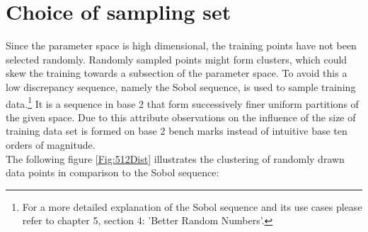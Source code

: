 	\section{Choice of sampling set}
		Since the parameter space is high dimensional, the training points have not been selected randomly. Randomly sampled points might form clusters, which could skew the training towards a subsection of the parameter space. To avoid this a low discrepancy sequence, namely the Sobol sequence, is used to sample training data.\footnote{For a more detailed explanation of the Sobol sequence and its use cases please refer to \cite{ModernCompFinance} chapter 5, section 4: 'Better Random Numbers'.} It is a sequence in base 2 that form successively finer uniform partitions of the given space. Due to this attribute observations on the influence of the size of training data set is formed on base 2 bench marks instead of intuitive base ten orders of magnitude.\\
		The following figure \ref{Fig:512Dist} illustrates the clustering of randomly drawn data points in comparison to the Sobol sequence:
